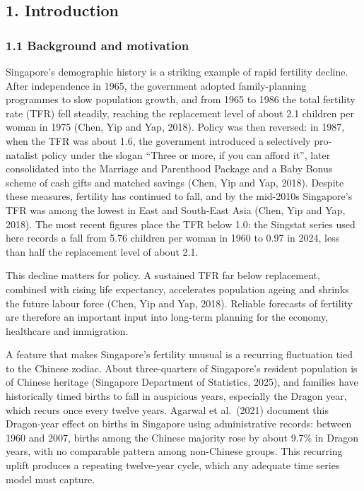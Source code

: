 \documentclass[
  11pt,
]{article}
\begin{document}
\subsection{1. Introduction}\label{introduction}

\subsubsection{1.1 Background and
motivation}\label{background-and-motivation}

Singapore's demographic history is a striking example of rapid fertility
decline. After independence in 1965, the government adopted
family-planning programmes to slow population growth, and from 1965 to
1986 the total fertility rate (TFR) fell steadily, reaching the
replacement level of about 2.1 children per woman in 1975 (Chen, Yip and
Yap, 2018). Policy was then reversed: in 1987, when the TFR was about
1.6, the government introduced a selectively pro-natalist policy under
the slogan ``Three or more, if you can afford it'', later consolidated
into the Marriage and Parenthood Package and a Baby Bonus scheme of cash
gifts and matched savings (Chen, Yip and Yap, 2018). Despite these
measures, fertility has continued to fall, and by the mid-2010s
Singapore's TFR was among the lowest in East and South-East Asia (Chen,
Yip and Yap, 2018). The most recent figures place the TFR below 1.0: the
Singstat series used here records a fall from 5.76 children per woman in
1960 to 0.97 in 2024, less than half the replacement level of about 2.1.

This decline matters for policy. A sustained TFR far below replacement,
combined with rising life expectancy, accelerates population ageing and
shrinks the future labour force (Chen, Yip and Yap, 2018). Reliable
forecasts of fertility are therefore an important input into long-term
planning for the economy, healthcare and immigration.

A feature that makes Singapore's fertility unusual is a recurring
fluctuation tied to the Chinese zodiac. About three-quarters of
Singapore's resident population is of Chinese heritage (Singapore
Department of Statistics, 2025), and families have historically timed
births to fall in auspicious years, especially the Dragon year, which
recurs once every twelve years. Agarwal et al.~(2021) document this
Dragon-year effect on births in Singapore using administrative records:
between 1960 and 2007, births among the Chinese majority rose by about
9.7\% in Dragon years, with no comparable pattern among non-Chinese
groups. This recurring uplift produces a repeating twelve-year cycle,
which any adequate time series model must capture.
\end{document}
